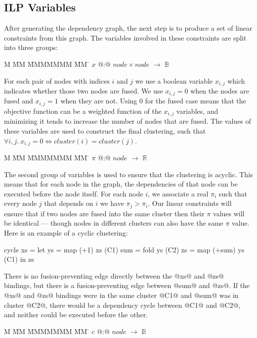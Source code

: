\subsection{ILP Variables}
After generating the dependency graph, the next step is to produce a set of linear constraints from this graph. The variables involved in these constraints are split into three groups:
\begin{tabbing}
M   \= MM \= MMMMMMM \= MM \= \kill
$x$   \> @:@  \> $node \times node$ \> $\to$ \> $\mathbb{B}$
\end{tabbing}

For each pair of nodes with indices $i$ and $j$ we use a boolean variable $x_{i,j}$ which indicates whether those two nodes are fused. We use $x_{i,j} = 0$ when the nodes are fused and $x_{i,j} = 1$ when they are not. Using $0$ for the fused case means that the objective function can be a weighted function of the $x_{i,j}$ variables, and minimizing it tends to increase the number of nodes that are fused. The values of these variables are used to construct the final clustering, such that $\forall i,j.\ x_{i,j} = 0 \iff cluster(i) = cluster(j)$.
\begin{tabbing}
M   \= MM \= MMMMMMM \= MM \= \kill
$\pi$ \> @:@  \> $node$             \> $\to$ \> $\mathbb{R}$
\end{tabbing}

The second group of variables is used to ensure that the clustering is acyclic. This means that for each node in the graph, the dependencies of that node can be executed before the node itself. For each node $i$, we associate a real $\pi_i$ such that every node $j$ that depends on $i$ we have $\pi_j > \pi_i$. Our linear constraints will ensure that if two nodes are fused into the same cluster then their $\pi$ values will be identical --- though nodes in different clusters can also have the same $\pi$ value. Here is an example of a cyclic clustering:
\begin{code}
  cycle xs  = let ys  = map (+1) xs     (C1)
                  sum = fold ys         (C2)
                  zs  = map (+sum) ys   (C1)
              in  zs
\end{code}

There is no fusion-preventing edge directly between the @xs@ and @zs@ bindings, but there is a fusion-preventing edge between @sum@ and @zs@. If the @xs@ and @zs@ bindings were in the same cluster @C1@ and @sum@ was in cluster @C2@, there would be a dependency cycle between @C1@ and @C2@, and neither could be executed before the other.
\begin{tabbing}
M   \= MM \= MMMMMMM \= MM \= \kill
$c$   \> @:@  \> $node$             \> $\to$ \> $\mathbb{B}$
\end{tabbing}


